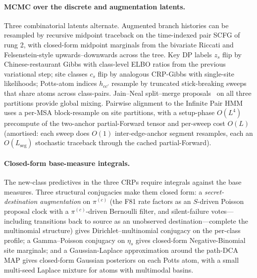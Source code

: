 \documentclass[11pt]{article}
\theoremstyle{definition}
\theoremstyle{remark}
\begin{document}
\paragraph{MCMC over the discrete and augmentation latents.}
Three combinatorial latents alternate. Augmented branch histories
can be resampled by recursive midpoint traceback on the time-indexed
pair SCFG of rung 2, with closed-form midpoint marginals from the
bivariate Riccati and Felsenstein-style upwards--downwards across
the tree.
Key DP labels $z_s$ flip by Chinese-restaurant Gibbs with
class-level ELBO ratios from the previous variational step; site
classes $c_s$ flip by analogous CRP-Gibbs with single-site
likelihoods; Potts-atom indices $h_{cc'}$ resample by truncated
stick-breaking sweeps that share atoms across class-pairs.
Jain--Neal split--merge proposals~\citep{jainneal2004} on all three
partitions provide global mixing.
Pairwise alignment to the Infinite Pair HMM~\citep{bealghahramani2002}
uses a per-MSA block-resample on site
partitions, with a setup-phase $O(L^4)$ precompute of the
two-anchor partial-Forward tensor and per-sweep cost $O(L)$
(amortised: each sweep does $O(1)$ inter-edge-anchor segment
resamples, each an $O(L_\text{seg})$ stochastic traceback through
the cached partial-Forward).

\paragraph{Closed-form base-measure integrals.}
The new-class predictives in the three CRPs require integrals
against the base measures. Three structural conjugacies make
them closed form: a \emph{secret-destination augmentation} on
$\pi^{(c)}$ (the F81 rate factors as an $S$-driven Poisson
proposal clock with a $\pi^{(c)}$-driven Bernoulli filter, and
silent-failure votes---including transitions back to source as an unobserved destination---complete the multinomial structure) gives
Dirichlet--multinomial conjugacy on the per-class profile; a
Gamma--Poisson conjugacy on $\eta_s$ gives closed-form
Negative-Binomial site marginals; and a Gaussian-Laplace
approximation around the path-DCA MAP gives closed-form Gaussian
posteriors on each Potts atom, with a small multi-seed Laplace
mixture for atoms with multimodal basins.
\end{document}
